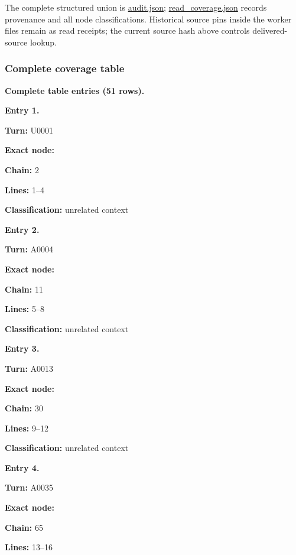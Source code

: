 The complete structured union is \url{audit.json};
\url{read_coverage.json} records provenance and all node
classifications. Historical source pins inside the worker files remain
as read receipts; the current source hash above controls
delivered-source lookup.

\subsubsection{Complete coverage table}\label{complete-coverage-table}

\textbf{Complete table entries (51 rows).}


\textbf{Entry 1.}

\textbf{Turn:} U0001

\textbf{Exact node:} \protect{}

\textbf{Chain:} 2

\textbf{Lines:} 1--4

\textbf{Classification:} unrelated context


\textbf{Entry 2.}

\textbf{Turn:} A0004

\textbf{Exact node:} \protect{}

\textbf{Chain:} 11

\textbf{Lines:} 5--8

\textbf{Classification:} unrelated context


\textbf{Entry 3.}

\textbf{Turn:} A0013

\textbf{Exact node:} \protect{}

\textbf{Chain:} 30

\textbf{Lines:} 9--12

\textbf{Classification:} unrelated context


\textbf{Entry 4.}

\textbf{Turn:} A0035

\textbf{Exact node:} \protect{}

\textbf{Chain:} 65

\textbf{Lines:} 13--16

